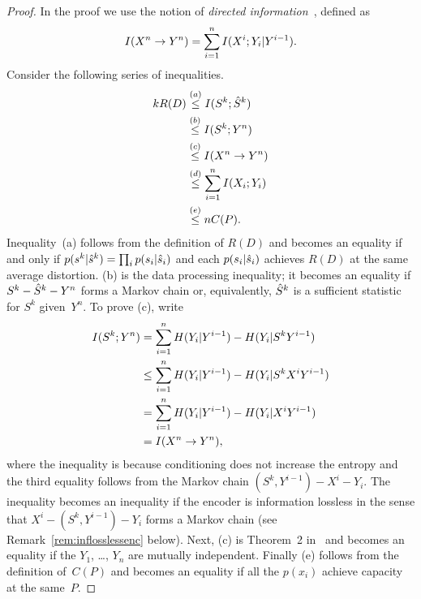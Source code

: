 \begin{proof}
  In the proof we use the notion of \emph{directed
  information}~\cite{Massey1990,Kramer1998}, defined as
  \begin{equation*}
    I(X^n \rightarrow Y^n) = \sum_{i=1}^n I(X^i; Y_i | Y^{i-1}).
  \end{equation*}
  Consider the following series of inequalities.
  \begin{align*}
    kR(D) &\stackrel{(a)}{\le} I(S^k; {\hat{S}}^k) \\
    &\stackrel{(b)}{\le} I(S^k; Y^n) \\
    &\stackrel{(c)}{\le} I(X^n \rightarrow Y^n) \\
    &\stackrel{(d)}{\le} \sum_{i=1}^n I(X_i; Y_i) \\
    &\stackrel{(e)}{\le} nC(P).
  \end{align*}
  Inequality~(a) follows from the definition of $R(D)$ and becomes an equality
  if and only if $p(s^k|{\hat{s}}^k)=\prod_i p(s_i|{\hat{s}}_i)$ and each $p(s_i|{\hat{s}}_i)$
  achieves $R(D)$ at the same average distortion. (b) is the data processing
  inequality; it becomes an equality if $S^k - {\hat{S}}^k - Y^n$ forms a Markov chain
  or, equivalently, ${\hat{S}}^k$ is a sufficient statistic for $S^k$ given~$Y^n$.
  To prove (c), write
  \begin{align*}
    I(S^k; Y^n)
    &= \sum_{i=1}^n H(Y_i|Y^{i-1}) - H(Y_i | S^k Y^{i-1}) \\
    &\le \sum_{i=1}^n H(Y_i|Y^{i-1}) - H(Y_i | S^k X^i Y^{i-1}) \\
    &= \sum_{i=1}^n H(Y_i|Y^{i-1}) - H(Y_i | X^i Y^{i-1}) \\
    &= I(X^n \rightarrow Y^n),
  \end{align*}
  where the inequality is because conditioning does not increase the entropy and
  the third equality follows from the Markov chain $(S^k, Y^{i-1}) - X^i - Y_i$.
  The inequality becomes an inequality if the encoder is information lossless in
  the sense that $X^i - (S^k, Y^{i-1}) - Y_i$ forms a Markov chain (see
  Remark~\ref{rem:inflosslessenc} below). Next, (c) is Theorem~2
  in~\cite{Massey1990} and becomes an equality if the $Y_1$, \dots, $Y_n$ are
  mutually independent. Finally (e) follows from the definition of~$C(P)$ and
  becomes an equality if all the $p(x_i)$ achieve capacity at the same~$P$. 
\end{proof}


